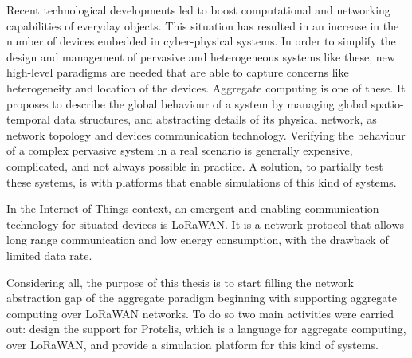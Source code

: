 Recent technological developments led to boost computational and networking capabilities of everyday objects. 
This situation has resulted in an increase in the number of devices embedded in cyber-physical systems.
In order to simplify the design and management of pervasive and heterogeneous systems like these, new high-level paradigms are needed that are able to capture concerns like heterogeneity and location of the devices.
Aggregate computing is one of these.
It proposes to describe the global behaviour of a system by managing global spatio-temporal data structures, and abstracting details of its physical network, as network topology and devices communication technology.
Verifying the behaviour of a complex pervasive system in a real scenario is generally expensive, complicated, and not always possible in practice.
A solution, to partially test these systems, is with platforms that enable simulations of this kind of systems.

In the Internet-of-Things context, an emergent and enabling communication technology for situated devices is LoRaWAN.
It is a network protocol that allows long range communication and low energy consumption, with the drawback of limited data rate.

Considering all, the purpose of this thesis is to start filling the network abstraction gap of the aggregate paradigm beginning with supporting aggregate computing over LoRaWAN networks.
To do so two main activities were carried out: design the support for Protelis, which is a language for aggregate computing, over LoRaWAN, and provide a simulation platform for this kind of systems. 